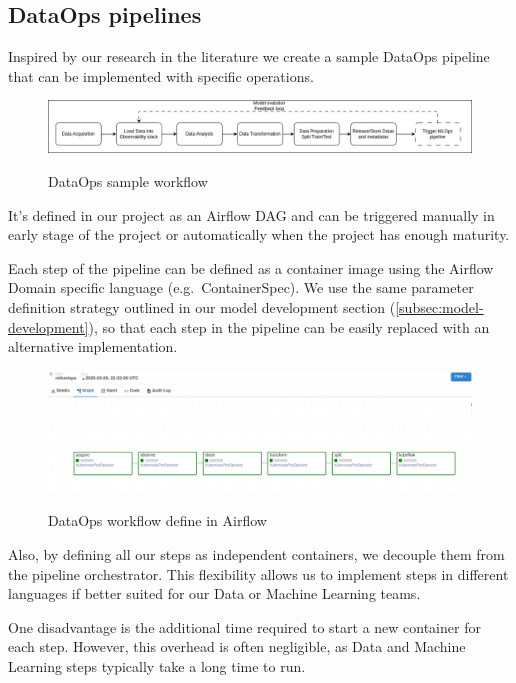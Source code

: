 \subsection{DataOps pipelines}\label{subsec:dataops-pipelines}
Inspired by our research in the literature we create a sample DataOps pipeline that can be implemented with specific
operations.

\begin{figure}[!htbp]
    \centering
    \caption{DataOps sample workflow}
    \includegraphics[scale=0.3]{images/project/dataops-workflow}
    \label{fig:project-dataops-workflow}
\end{figure}

It's defined in our project as an Airflow DAG and can be triggered manually in early stage of the project or
automatically when the project has enough maturity.

Each step of the pipeline can be defined as a container image using the Airflow Domain specific language (e.g.\ ContainerSpec).
We use the same parameter definition strategy outlined in our model development section (\ref{subsec:model-development}),
so that each step in the pipeline can be easily replaced with an alternative implementation.

\begin{figure}[!htbp]
    \centering
    \caption{DataOps workflow define in Airflow}
    \includegraphics[scale=0.3]{images/project/dataops-workflow-airflow}
    \label{fig:dataops-workflow-airflow}
\end{figure}

Also, by defining all our steps as independent containers, we decouple them from the pipeline orchestrator.
This flexibility allows us to implement steps in different languages if better suited for our Data or Machine Learning teams.

One disadvantage is the additional time required to start a new container for each step.
However, this overhead is often negligible, as Data and Machine Learning steps typically take a long time to run.

